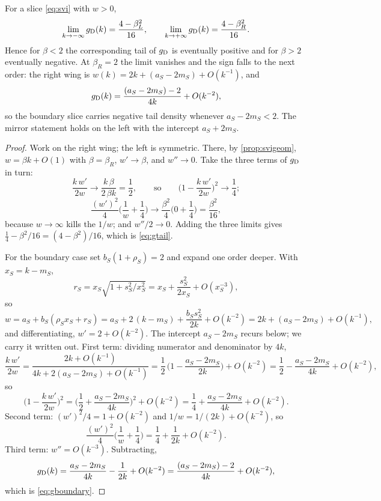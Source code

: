 \begin{proposition}
\label{prop:gtail}
For a slice \eqref{eq:svi} with $w>0$,
\begin{equation}
\lim_{k\to-\infty}g_{\rm D}(k)=\frac{4-\beta_L^2}{16},\qquad
\lim_{k\to+\infty}g_{\rm D}(k)=\frac{4-\beta_R^2}{16}.
\label{eq:gtail}
\end{equation}
Hence for $\beta<2$ the corresponding tail of $g_{\rm D}$ is eventually
positive and for $\beta>2$ eventually negative.  At $\beta_R=2$ the
limit vanishes and the sign falls to the next order: the right wing is
$w(k)=2k+(a_S-2m_S)+O(k^{-1})$, and
\begin{equation}
g_{\rm D}(k)=\frac{(a_S-2m_S)-2}{4k}+O(k^{-2}),
\label{eq:gboundary}
\end{equation}
so the boundary slice carries negative tail density whenever
$a_S-2m_S<2$.  The mirror statement holds on the left with the
intercept $a_S+2m_S$.
\end{proposition}

\begin{proof}
Work on the right wing; the left is symmetric.  There, by
\cref{prop:svigeom}, $w=\beta k+O(1)$ with $\beta=\beta_R$,
$w'\to\beta$, and $w''\to0$.  Take the three terms of $g_{\rm D}$ in
turn:
\[
\frac{k\,w'}{2w}\longrightarrow\frac{k\,\beta}{2\,\beta k}=\frac12,
\qquad\text{so}\qquad
\Big(1-\frac{k\,w'}{2w}\Big)^{2}\longrightarrow\frac14;
\]
\[
\frac{(w')^2}{4}\Big(\frac1w+\frac14\Big)
\longrightarrow\frac{\beta^2}{4}\Big(0+\frac14\Big)=\frac{\beta^2}{16},
\]
because $w\to\infty$ kills the $1/w$; and $w''/2\to0$.  Adding the
three limits gives $\tfrac14-\beta^2/16=(4-\beta^2)/16$, which is
\eqref{eq:gtail}.

For the boundary case set $b_S(1+\rho_S)=2$ and expand one order
deeper.  With $x_S=k-m_S$,
\[
r_S=x_S\sqrt{1+s_S^2/x_S^2}
=x_S+\frac{s_S^2}{2x_S}+O(x_S^{-3}),
\]
so
\[
w=a_S+b_S(\rho_S x_S+r_S)
=a_S+2\,(k-m_S)+\frac{b_S s_S^2}{2k}+O(k^{-2})
=2k+(a_S-2m_S)+O(k^{-1}),
\]
and differentiating, $w'=2+O(k^{-2})$.  The intercept $a_S-2m_S$
recurs below; we carry it written out.  First term: dividing numerator
and denominator by $4k$,
\[
\frac{k\,w'}{2w}
=\frac{2k+O(k^{-1})}{4k+2(a_S-2m_S)+O(k^{-1})}
=\frac12\,\Big(1-\frac{a_S-2m_S}{2k}\Big)+O(k^{-2})
=\frac12-\frac{a_S-2m_S}{4k}+O(k^{-2}),
\]
so
\[
\Big(1-\frac{k\,w'}{2w}\Big)^{2}
=\Big(\frac12+\frac{a_S-2m_S}{4k}\Big)^{2}+O(k^{-2})
=\frac14+\frac{a_S-2m_S}{4k}+O(k^{-2}).
\]
Second term: $(w')^2/4=1+O(k^{-2})$ and
$1/w=1/(2k)+O(k^{-2})$, so
\[
\frac{(w')^2}{4}\Big(\frac1w+\frac14\Big)
=\frac14+\frac{1}{2k}+O(k^{-2}).
\]
Third term: $w''=O(k^{-3})$.  Subtracting,
\[
g_{\rm D}(k)
=\frac{a_S-2m_S}{4k}-\frac{1}{2k}+O(k^{-2})
=\frac{(a_S-2m_S)-2}{4k}+O(k^{-2}),
\]
which is \eqref{eq:gboundary}.
\end{proof}

